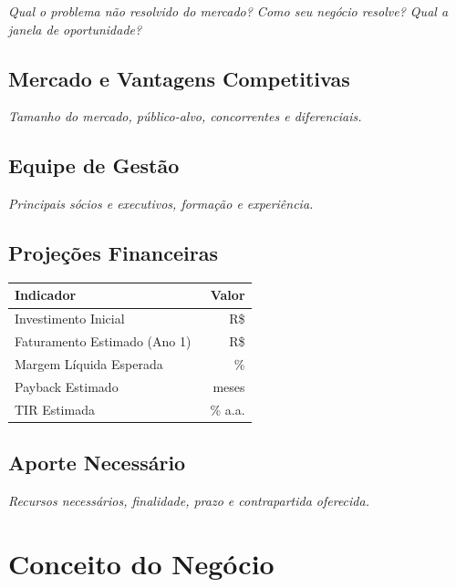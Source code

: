 \documentclass[
	12pt,
	openright,
	oneside,
	a4paper,
	chapter=TITLE,
	section=TITLE,
	english,
	brazil
	]{abntex2}
\newcommand{\instrucao}[1]{%
	\vspace{0.3cm}%
	\noindent%
	{%
		\setlength{\fboxsep}{6pt}%
		\colorbox{azul-claro}{%
			\begin{minipage}{\dimexpr\textwidth-2\fboxsep\relax}%
				\setlength{\parindent}{1.25cm}%
				{\color{cinza-instrucao}\small\itshape #1}%
			\end{minipage}%
		}%
	}%
	\vspace{0.3cm}%
}
\begin{document}
\instrucao{Qual o problema não resolvido do mercado? Como seu negócio resolve? Qual a janela de oportunidade?}

\section{Mercado e Vantagens Competitivas}

\instrucao{Tamanho do mercado, público-alvo, concorrentes e diferenciais.}

\section{Equipe de Gestão}

\instrucao{Principais sócios e executivos, formação e experiência.}

\section{Projeções Financeiras}

\vspace{0.2cm}
\centering
\begin{tabularx}{\textwidth}{X r}
\toprule
\rowcolor{azul-claro}
\textbf{Indicador} & \textbf{Valor} \\
\midrule
Investimento Inicial              & R\$ \hrulefill \\
Faturamento Estimado (Ano 1)     & R\$ \hrulefill \\
Margem Líquida Esperada           & \hrulefill\ \% \\
Payback Estimado                  & \hrulefill\ meses \\
TIR Estimada                      & \hrulefill\ \% a.a. \\
\bottomrule
\end{tabularx}
\label{tab:projecoes-financeiras}

\section{Aporte Necessário}

\instrucao{Recursos necessários, finalidade, prazo e contrapartida oferecida.}

\clearpage

\chapter{Conceito do Negócio}
\end{document}
